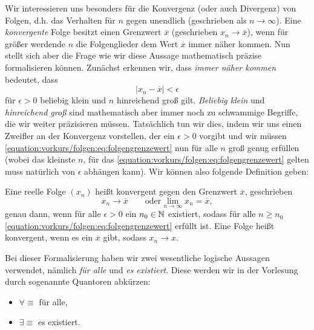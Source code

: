 Wir interessieren uns besonders für die Konvergenz (oder auch Divergenz) von Folgen, d.h. das Verhalten für \(n\) gegen unendlich (geschrieben als \(n \rightarrow \infty\)). Eine \emph{konvergente} Folge besitzt einen Grenzwert \(\overline{x}\)
(geschrieben \(x_n \rightarrow \overline{x}\)), wenn für größer werdende \(n\) die Folgenglieder dem Wert \(\overline{x}\) immer näher kommen. Nun stellt sich aber die Frage wie wir diese Aussage mathematisch präzise formalisieren können. Zunächst erkennen wir, dass \emph{immer näher kommen}  bedeutet, dass
\begin{equation}\label{equation:vorkurs/folgen:eq:folgengrenzewert}
\vert x_n - \overline{x} \vert < \epsilon
\end{equation}
für \(\epsilon > 0\) beliebig klein und \(n\) hinreichend groß gilt. \emph{Beliebig klein} und  \emph{hinreichend groß} sind mathematisch aber immer noch zu schwammige Begriffe, die wir weiter präzisieren müssen. Tatsächlich tun wir dies, indem wir uns einen Zweifler an der Konvergenz vorstellen, der ein \(\epsilon > 0\) vorgibt und wir müssen \eqref{equation:vorkurs/folgen:eq:folgengrenzewert} nun für alle \(n\) groß genug erfüllen (wobei das kleinste \(n\), für das \eqref{equation:vorkurs/folgen:eq:folgengrenzewert} gelten muss natürlich von \(\epsilon\) abhängen kann). Wir können also folgende Definition geben:
\label{vorkurs/folgen:definition-0}
\begin{definition}{}{}



Eine reelle Folge \((x_n)\) heißt konvergent gegen den Grenzwert \(\overline{x}\), geschrieben
\begin{equation*}
x_n \rightarrow \overline{x} \qquad \text{oder} \lim_{n \rightarrow \infty} x_n = \overline{x},
\end{equation*}
genau dann, wenn für alle \(\epsilon > 0\) ein \(n_0 \in \mathbb{N}\) existiert, sodass für alle \(n \geq n_0\) \eqref{equation:vorkurs/folgen:eq:folgengrenzewert} erfüllt ist.
Eine Folge heißt konvergent, wenn es ein \(\overline{x}\) gibt, sodass \(x_n \rightarrow x\).
\end{definition}

Bei dieser Formalisierung haben wir zwei wesentliche logische Aussagen verwendet, nämlich \emph{für alle} und \emph{es existiert}. Diese werden wir in der Vorlesung durch sogenannte Quantoren abkürzen:
\begin{itemize}
\item {} 
\(\forall \equiv\) für alle,

\item {} 
\(\exists \equiv\) es existiert.

\end{itemize}

